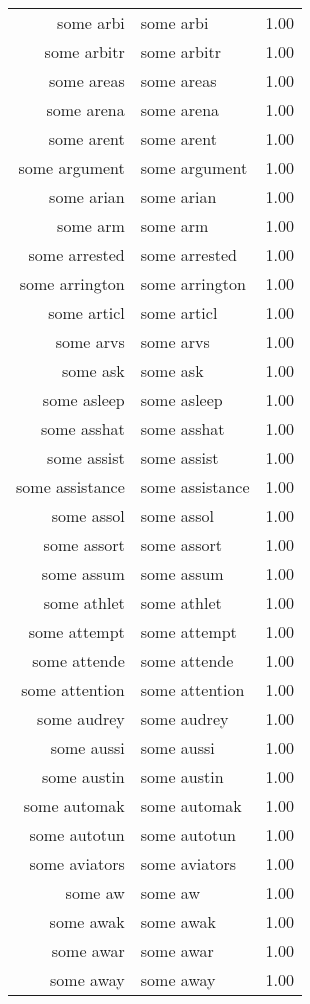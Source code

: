 \begin{table}[ht]
\begin{tabular}{rlr}
  some arbi & some arbi & 1.00 \\ 
  some arbitr & some arbitr & 1.00 \\ 
  some areas & some areas & 1.00 \\ 
  some arena & some arena & 1.00 \\ 
  some arent & some arent & 1.00 \\ 
  some argument & some argument & 1.00 \\ 
  some arian & some arian & 1.00 \\ 
  some arm & some arm & 1.00 \\ 
  some arrested & some arrested & 1.00 \\ 
  some arrington & some arrington & 1.00 \\ 
  some articl & some articl & 1.00 \\ 
  some arvs & some arvs & 1.00 \\ 
  some ask & some ask & 1.00 \\ 
  some asleep & some asleep & 1.00 \\ 
  some asshat & some asshat & 1.00 \\ 
  some assist & some assist & 1.00 \\ 
  some assistance & some assistance & 1.00 \\ 
  some assol & some assol & 1.00 \\ 
  some assort & some assort & 1.00 \\ 
  some assum & some assum & 1.00 \\ 
  some athlet & some athlet & 1.00 \\ 
  some attempt & some attempt & 1.00 \\ 
  some attende & some attende & 1.00 \\ 
  some attention & some attention & 1.00 \\ 
  some audrey & some audrey & 1.00 \\ 
  some aussi & some aussi & 1.00 \\ 
  some austin & some austin & 1.00 \\ 
  some automak & some automak & 1.00 \\ 
  some autotun & some autotun & 1.00 \\ 
  some aviators & some aviators & 1.00 \\ 
  some aw & some aw & 1.00 \\ 
  some awak & some awak & 1.00 \\ 
  some awar & some awar & 1.00 \\ 
  some away & some away & 1.00 \\ 

\end{tabular}
\end{table}
